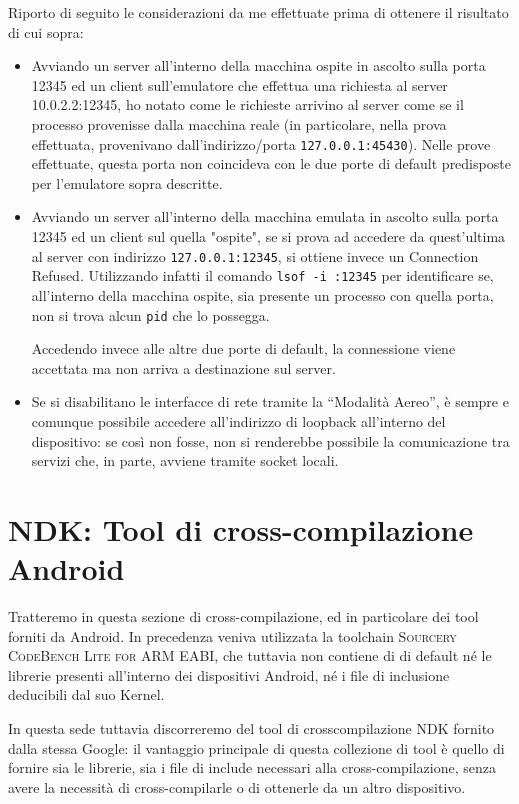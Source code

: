 Riporto di seguito le considerazioni da me effettuate prima di ottenere il risultato
di cui sopra:
\begin{itemize}
\item Avviando un server all'interno della macchina ospite in ascolto sulla 
	porta 12345 ed un client sull'emulatore che effettua una richiesta al 
	server 10.0.2.2:12345, ho notato come le richieste arrivino al server 
	come se il processo provenisse dalla macchina reale (in particolare, nella
	prova effettuata, provenivano dall'indirizzo/porta \texttt{\small 127.0.0.1:45430}).
	Nelle prove effettuate, questa porta non coincideva con le due porte di
	default predisposte per l'emulatore sopra descritte.

\item Avviando un server all'interno della macchina emulata in ascolto sulla 
	porta 12345 ed un client sul quella "ospite", se si prova ad accedere 
	da quest'ultima al server con indirizzo \texttt{\small 127.0.0.1:12345}, 
	si ottiene invece un Connection Refused. Utilizzando infatti il comando
	\texttt{\small lsof -i :12345} per identificare se, all'interno della 
	macchina ospite, sia presente un processo con quella porta, non si trova
	alcun \texttt{\small pid} che lo possegga.
	
	Accedendo invece alle altre due porte di default, la connessione viene
	accettata ma non arriva a destinazione sul server.

\item Se si disabilitano le interfacce di rete tramite la ``Modalità Aereo'',
	è sempre e comunque possibile accedere all'indirizzo di loopback all'interno
	del dispositivo: se così non fosse, non si renderebbe possibile la 
	comunicazione tra servizi che, in parte, avviene tramite socket locali.
\end{itemize}

\section{NDK: Tool di cross-compilazione Android}\label{sec:NDKtool}
Tratteremo in questa sezione di cross-compilazione, ed in particolare dei tool
forniti da Android. In precedenza veniva utilizzata la toolchain 
\textsc{Sourcery CodeBench Lite for ARM EABI}, che tuttavia non contiene di 
di default né le librerie presenti all'interno dei dispositivi Android, né i 
file di inclusione deducibili dal suo Kernel.

In questa sede tuttavia discorreremo del tool di crosscompilazione NDK fornito
dalla stessa Google: il vantaggio principale di questa collezione di tool è quello di fornire 
sia le librerie, sia i file di include necessari alla cross-compilazione, senza
avere la necessità di cross-compilarle o di ottenerle da un altro dispositivo.

